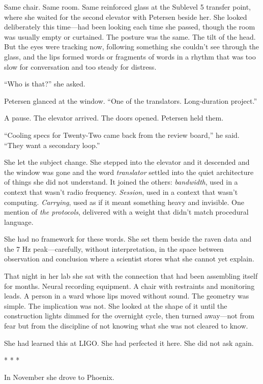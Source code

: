 \documentclass[12pt]{article}
\newcommand{\scenebreak}{\begin{center}* * *\end{center}}
\begin{document}
Same chair. Same room. Same reinforced glass at the Sublevel 5 transfer point, where she waited for the second elevator with Petersen beside her. She looked deliberately this time---had been looking each time she passed, though the room was usually empty or curtained. The posture was the same. The tilt of the head. But the eyes were tracking now, following something she couldn't see through the glass, and the lips formed words or fragments of words in a rhythm that was too slow for conversation and too steady for distress.

``Who is that?'' she asked.

Petersen glanced at the window. ``One of the translators. Long-duration project.''

A pause. The elevator arrived. The doors opened. Petersen held them.

``Cooling specs for Twenty-Two came back from the review board,'' he said. ``They want a secondary loop.''

She let the subject change. She stepped into the elevator and it descended and the window was gone and the word \textit{translator} settled into the quiet architecture of things she did not understand. It joined the others: \textit{bandwidth}, used in a context that wasn't radio frequency. \textit{Session}, used in a context that wasn't computing. \textit{Carrying}, used as if it meant something heavy and invisible. One mention of \textit{the protocols}, delivered with a weight that didn't match procedural language.

She had no framework for these words. She set them beside the raven data and the 7 Hz peak---carefully, without interpretation, in the space between observation and conclusion where a scientist stores what she cannot yet explain.

That night in her lab she sat with the connection that had been assembling itself for months. Neural recording equipment. A chair with restraints and monitoring leads. A person in a ward whose lips moved without sound. The geometry was simple. The implication was not. She looked at the shape of it until the construction lights dimmed for the overnight cycle, then turned away---not from fear but from the discipline of not knowing what she was not cleared to know.

She had learned this at LIGO. She had perfected it here. She did not ask again.

\scenebreak

In November she drove to Phoenix.
\end{document}
